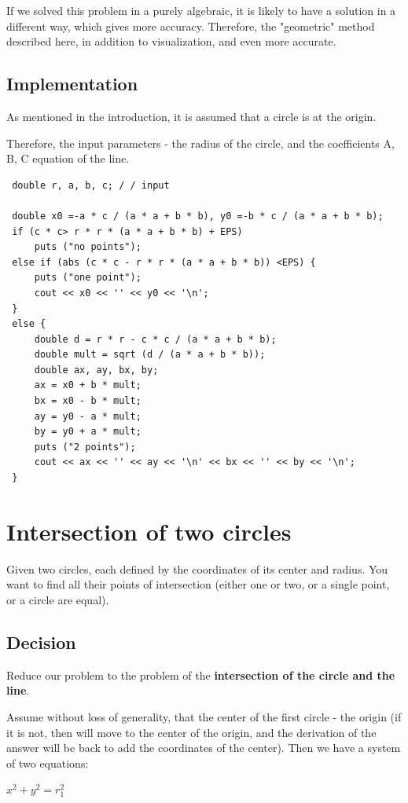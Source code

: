 If we solved this problem in a purely algebraic, it is likely to have a solution in a different way, which gives more accuracy. Therefore, the "geometric" method described here, in addition to visualization, and even more accurate.

\subsection{ Implementation }
As mentioned in the introduction, it is assumed that a circle is at the origin.

Therefore, the input parameters - the radius of the circle, and the coefficients A, B, C equation of the line.

\begin{verbatim}
 double r, a, b, c; / / input

 double x0 =-a * c / (a ​​* a + b * b), y0 =-b * c / (a ​​* a + b * b);
 if (c * c> r * r * (a * a + b * b) + EPS)
     puts ("no points");
 else if (abs (c * c - r * r * (a * a + b * b)) <EPS) {
     puts ("one point");
     cout << x0 << '' << y0 << '\n';
 }
 else {
     double d = r * r - c * c / (a ​​* a + b * b);
     double mult = sqrt (d / (a ​​* a + b * b));
     double ax, ay, bx, by;
     ax = x0 + b * mult;
     bx = x0 - b * mult;
     ay = y0 - a * mult;
     by = y0 + a * mult;
     puts ("2 points");
     cout << ax << '' << ay << '\n' << bx << '' << by << '\n';
 } 
\end{verbatim}
\section{ Intersection of two circles }
Given two circles, each defined by the coordinates of its center and radius. You want to find all their points of intersection (either one or two, or a single point, or a circle are equal).

\subsection{ Decision }
Reduce our problem to the problem of the \textbf{intersection of the circle and the line}.

Assume without loss of generality, that the center of the first circle - the origin (if it is not, then will move to the center of the origin, and the derivation of the answer will be back to add the coordinates of the center). Then we have a system of two equations:

$x^2 + y^2 = r_1^2$

